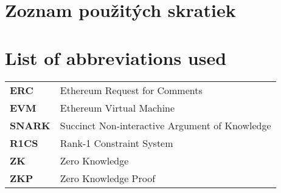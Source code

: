 \thispagestyle{plain}

\ifx\FIITlagEN\undefined
    \section*{\Huge Zoznam použitých skratiek}
\else
    \section*{\Huge List of abbreviations used}
\fi
\vskip 1cm

\begin{tabular}{ >{\bfseries}m{2cm} m{10cm} }
	ERC & Ethereum Request for Comments \\
	EVM & Ethereum Virtual Machine 	\\
	SNARK & Succinct Non-interactive Argument of Knowledge \\
	R1CS & Rank-1 Constraint System \\
	ZK  & Zero Knowledge           	\\
	ZKP & Zero Knowledge Proof
\end{tabular}

\emptypage
